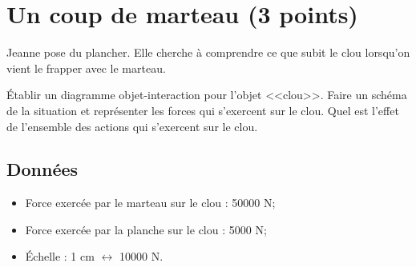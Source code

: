\section{Un coup de marteau (3 points)}\label{marteau}

Jeanne pose du plancher. Elle cherche à comprendre ce que subit le clou lorsqu'on vient le frapper avec le marteau.

\begin{questions}
	\question \'Etablir un diagramme objet-interaction pour l'objet <<clou>>.
	\question Faire un schéma de la situation et représenter les forces qui s'exercent sur le clou.
	\question Quel est l'effet de l'ensemble des actions qui s'exercent sur le clou.
	
\end{questions}

\subsection*{Données}
	\begin{itemize}
		\item Force exercée par le marteau sur le clou : \num{50000} N;
		\item Force exercée par la planche sur le clou : \num{5000} N;
		\item \'Echelle : 1 cm $\leftrightarrow$ \num{10000} N.
	\end{itemize}